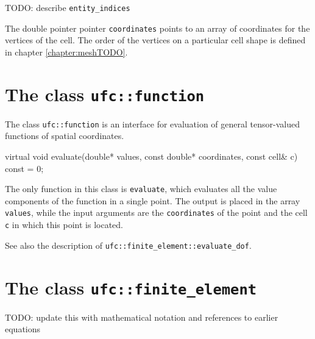 TODO: describe 
\texttt{entity\_indices}

The double pointer pointer \texttt{coordinates} points to an array of coordinates for the vertices of the cell.
The order of the vertices on a particular cell shape is defined in chapter \ref{chapter:meshTODO}.


\section{The class \texttt{ufc::function}}







The class \texttt{ufc::function} is an interface for evaluation of
general tensor-valued functions of spatial coordinates.

\begin{code}
virtual void evaluate(double* values,
                      const double* coordinates,
                      const cell& c) const = 0;
\end{code}

The only function in this class is \texttt{evaluate},
which evaluates all the value components of the function in a single point.
The output is placed in the array \texttt{values},
while the input arguments are the \texttt{coordinates} of the point
and the cell \texttt{c} in which this point is located.

See also the description of \texttt{ufc::finite\_element::evaluate\_dof}.


\section{The class \texttt{ufc::finite\_element}}

TODO: update this with mathematical notation and references to earlier equations

